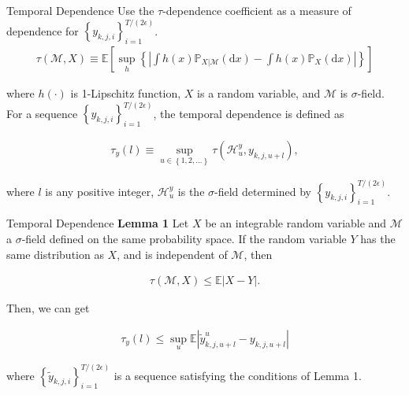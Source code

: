 \documentclass{beamer}		%
\newcommand{\dd}{\mathrm{d}}
\begin{document}
\begin{frame}{Temporal Dependence}
Use the $\tau$-dependence coefficient as a measure of dependence for $\left\{y_{k,j,i} \right\}_{i=1}^{T/(2\epsilon)}$.
\begin{align}
\tau(\mathcal{M}, X) \equiv \mathbb{E}\left[\sup_h \left\{\left| \int h(x)\mathbb{P}_{X|\mathcal{M}}(\dd x) - \int h(x)\mathbb{P}_X (\dd x) \right| \right\} \right]
\end{align}

where $h(\cdot)$ is 1-Lipschitz function, $X$ is a random variable, and $\mathcal{M}$ is $\sigma$-field. For a sequence $\left\{y_{k,j,i} \right\}_{i=1}^{T/(2\epsilon)}$, the temporal dependence is defined as

\begin{align}
\tau_y(l) \equiv \sup_{u \in \left\{1,2,\ldots \right\}} \tau(\mathcal{H}_u^y, y_{k,j,u+l}),
\end{align}

where $l$ is any positive integer, $\mathcal{H}_u^y$ is the $\sigma$-field determined by $\left\{y_{k,j,i} \right\}_{i=1}^{T/(2\epsilon)}$.
    
\end{frame}









\begin{frame}{Temporal Dependence}
\textbf{Lemma 1} Let $X$ be an integrable random variable and $\mathcal{M}$ a $\sigma$-field defined on the same probability space. If the random variable $Y$ has the same distribution as $X$, and is independent of $\mathcal{M}$, then

\begin{align}
\tau(\mathcal{M}, X) \leq \mathbb{E}|X - Y|.
\end{align}

Then, we can get

\begin{align}
\tau_y(l) \leq \sup_u \mathbb{E}\left| \tilde{y}_{k,j,u+l}^u - y_{k,j,u+l} \right|
\end{align}

where $\left\{\tilde{y}_{k,j,i} \right\}_{i=1}^{T/(2\epsilon)}$ is a sequence satisfying the conditions of Lemma 1.

\end{frame}
\end{document}
